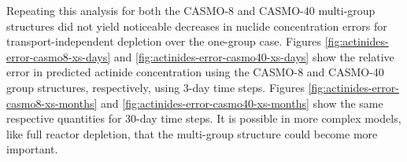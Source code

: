     Repeating this analysis for both the CASMO-8 and CASMO-40 multi-group
    structures did not yield noticeable decreases in nuclide concentration
    errors for transport-independent depletion over the one-group case.  Figures
    \ref{fig:actinides-error-casmo8-xs-days} and
    \ref{fig:actinides-error-casmo40-xs-days} show the relative error in
    predicted actinide concentration using the CASMO-8 and CASMO-40 group
    structures, respectively, using 3-day time steps. Figures
    \ref{fig:actinides-error-casmo8-xs-months} and
    \ref{fig:actinides-error-casmo40-xs-months} show the same respective
    quantities for 30-day time steps.  It is possible in more complex models,
    like full reactor depletion, that the multi-group structure could become more
    important.

    \begin{figure}[htpb]
        \centering
        \\
\end{figure}
